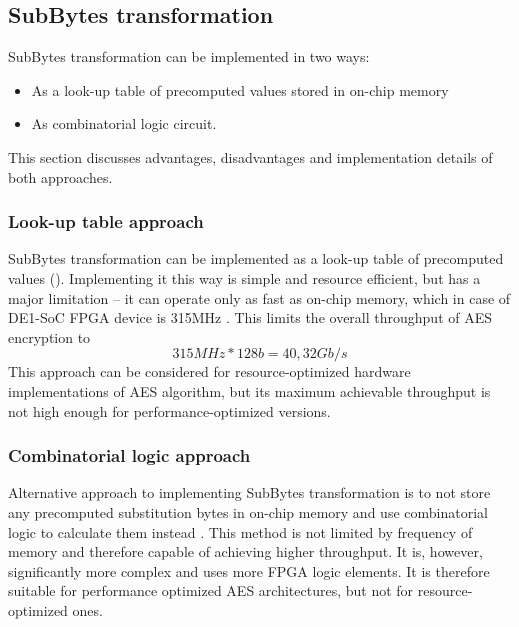 \subsection{SubBytes transformation}
\label{sec:sub-bytes}

SubBytes transformation can be implemented in two ways:
\begin{itemize}[nolistsep]
\item As a look-up table of precomputed values stored in on-chip memory
\item As combinatorial logic circuit.
\end{itemize}
This section discusses advantages, disadvantages and implementation details of both approaches.

\subsubsection{Look-up table approach}
SubBytes transformation can be implemented as a look-up table of precomputed values (\cite[Fig. 7]{aes-standard}). Implementing it this way is simple and resource efficient, but has a major limitation -- it can operate only as fast as on-chip memory, which in case of DE1-SoC FPGA device is 315MHz \cite[Table 2-1]{altera-vol1}. This limits the overall throughput of AES encryption to
$$
315MHz * 128b = 40,32Gb/s
$$
This approach can be considered for resource-optimized hardware implementations of AES algorithm, but its maximum achievable throughput is not high enough for performance-optimized versions.

\subsubsection{Combinatorial logic approach}
\label{sec:comb-theory}
Alternative approach to implementing SubBytes transformation is to not store any precomputed substitution bytes in on-chip memory and use combinatorial logic to calculate them instead \cite{practical-sub-bytes}. This method is not limited by frequency of memory and therefore capable of achieving higher throughput. It is, however, significantly more complex and uses more FPGA logic elements. It is therefore suitable for performance optimized AES architectures, but not for resource-optimized ones.

